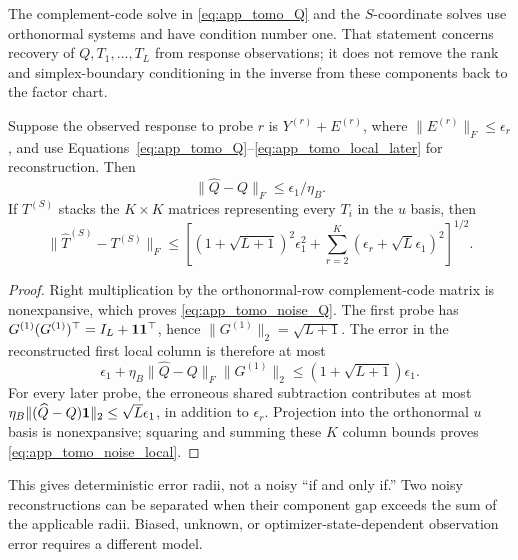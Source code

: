 The complement-code solve in \eqref{eq:app_tomo_Q} and the $S$-coordinate
solves use orthonormal systems and have condition number one.  That statement
concerns recovery of $Q,T_1,\ldots,T_L$ from response observations; it does
not remove the rank and simplex-boundary conditioning in the inverse from
these components back to the factor chart.

\begin{proposition}
\label{prop:response_tomography_noise}
Suppose the observed response to probe $r$ is
$Y^{(r)}+E^{(r)}$, where
$\|E^{(r)}\|_F\le\epsilon_r$, and use
Equations~\ref{eq:app_tomo_Q}--\ref{eq:app_tomo_local_later} for reconstruction.
Then
\begin{equation}
 \|\widehat Q-Q\|_F\le\epsilon_1/\eta_B.
 \label{eq:app_tomo_noise_Q}
\end{equation}
If $T^{(S)}$ stacks the $K\times K$ matrices representing every $T_i$
in the $u$ basis, then
\begin{equation}
 \|\widehat T^{(S)}-T^{(S)}\|_F
 \le\left[(1+\sqrt{L+1})^2\epsilon_1^2+
 \sum_{r=2}^K(\epsilon_r+\sqrt L\epsilon_1)^2\right]^{1/2}.
 \label{eq:app_tomo_noise_local}
\end{equation}
\end{proposition}

\begin{proof}
Right multiplication by the orthonormal-row complement-code matrix is
nonexpansive, which proves \eqref{eq:app_tomo_noise_Q}.  The first probe has
$G^{(1)}(G^{(1)})^\top=I_L+\mathbf{1}\mathbf{1}^\top$, hence
$\|G^{(1)}\|_2=\sqrt{L+1}$.  The error in the reconstructed first local
column is therefore at most
\[
 \epsilon_1+\eta_B\|\widehat Q-Q\|_F\|G^{(1)}\|_2
 \le(1+\sqrt{L+1})\epsilon_1.
\]
For every later probe, the erroneous shared subtraction contributes at most
$\eta_B\|(\widehat Q-Q)\mathbf{1}\|_2\le\sqrt L\epsilon_1$, in addition to
$\epsilon_r$.  Projection into the orthonormal $u$ basis is nonexpansive;
squaring and summing these $K$ column bounds proves
\eqref{eq:app_tomo_noise_local}.
\end{proof}

This gives deterministic error radii, not a noisy ``if and only if.''  Two
noisy reconstructions can be separated when their component gap exceeds the
sum of the applicable radii.  Biased, unknown, or optimizer-state-dependent
observation error requires a different model.


